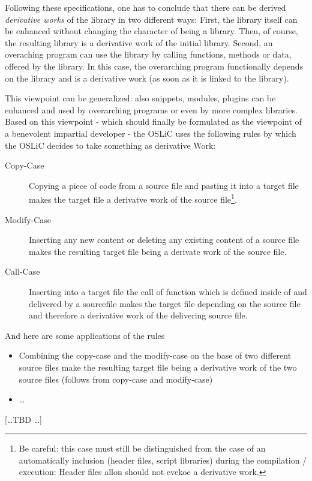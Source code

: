 Following these specifications, one has to conclude that there can be derived
\emph{derivative works} of the library in two different ways: First, the library
itself can be enhanced without changing the character of being a library. Then,
of course, the resulting library is a derivative work of the initial library.
Second, an overaching program can use the library by calling functions, methods
or data, offered by the library. In this case, the overarching program
functionally depends on the library and is a derivative work (as soon as it is
linked to the library).

This viewpoint can be generalized: also snippets, modules, plugins can be
enhanced and used by overarching programs or even by more complex libraries.
Based on this viewpoint - which should finally be formulated as the viewpoint of
a benevolent impartial developer - the OSLiC uses the following rules by which
the OSLiC decides to take something as derivative Work:
\label{sec:BenevolentDerivativeWorkUnderstanding}

\begin{description}
  \item[Copy-Case] Copying a piece of code from a source file and pasting it
  into a target file makes the target file a derivatve work of the source
  file\footnote{ Be careful: this case must still be distinguished from the case
  of an automatically inclusion (header files, script libraries) during the
  compilation / execution: Header files allon should not evekoe a derivative
  work.}.
  \item[Modify-Case] Inserting any new content or deleting any existing content
  of a source file makes the resulting target file being a derivate work of the
  source file.
  \item[Call-Case] Inserting into a target file the call of function which is
  defined inside of and delivered by a sourcefile makes the target file
  depending on the source file and therefore a derivative work of the delivering
  source file.
\end{description}

And here are some applications of the rules

\begin{itemize}
  \item Combining the copy-case and the modify-case on the base of two
  different source files make the resulting target file being a derivative work
  of the two source files (follows from copy-case and modify-case)
  \item \ldots
\end{itemize}

[\ldots TBD \ldots]

%
